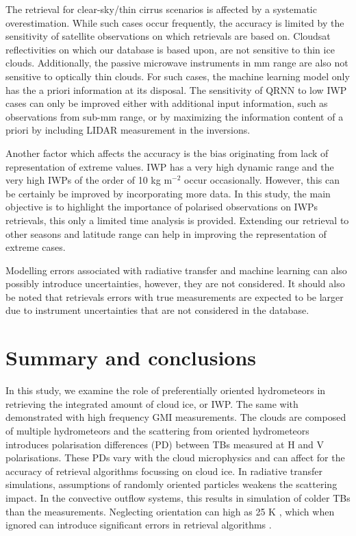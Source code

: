 \documentclass[amt, manuscript]{copernicus}
\begin{document}
The retrieval for clear-sky/thin cirrus scenarios is affected by a systematic overestimation. While such cases occur frequently, the accuracy is limited by the sensitivity of satellite observations on which retrievals are based on. Cloudsat reflectivities on which our database is based upon, are not sensitive to thin ice clouds. Additionally, the passive microwave instruments in mm range are also not sensitive to optically thin clouds. For such cases, the machine learning model only has the a priori information at its disposal. The sensitivity of QRNN to low IWP cases can only be improved either with additional input information, such as observations from sub-mm range, or by maximizing the information content of a priori by including LIDAR measurement in the inversions.

Another factor which affects the accuracy is the bias originating from lack of representation of extreme values. IWP has a very high dynamic range and the very high IWPs of the order of 10\,\,kg m$^{-2}$ occur occasionally. However, this can be certainly be improved by incorporating more data. In this study, the main objective is to highlight the importance of polarised observations on IWPs retrievals, this only a limited time analysis is provided. Extending our retrieval to other seasons and latitude range can help in improving the representation of extreme cases. 

Modelling errors associated with radiative transfer and machine learning can also possibly introduce uncertainties, however, they are not considered. It should also be noted that retrievals errors with true measurements are expected to be larger due to instrument uncertainties that are not considered in the database. 


\section{Summary and conclusions}
%
\label{sec:conclusions}

In this study, we examine the role of preferentially oriented hydrometeors in retrieving the integrated amount of cloud ice, or IWP. The same with demonstrated with high frequency GMI measurements. The clouds are composed of multiple hydrometeors and the scattering from oriented hydrometeors introduces polarisation differences (PD) between TBs measured at H and V polarisations. These PDs vary with the cloud microphysics and can affect for the accuracy of retrieval algorithms focussing on cloud ice. In radiative transfer simulations, assumptions of randomly oriented particles weakens the scattering impact. In the convective outflow systems, this results in simulation of colder TBs than the measurements. Neglecting orientation can  high as 25\,\,K , which when ignored can introduce significant errors in retrieval algorithms .
\end{document}
